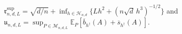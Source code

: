 \(\mathfrak r^{\mathrm{sup}}_{n,d,L}=\sqrt{d/n}+\inf_{h\in\mathcal H_{n,d}}\{Lh^2+(n\sqrt d\,h^3)^{-1/2}\}\) and \(\mathfrak u_{n,d,L}=\sup_{P\in\mathcal M_{n,d,L}}\mathbb E_P[\overline b_{h^\dagger}(A)+\overline s_{h^\dagger}(A)]\).
